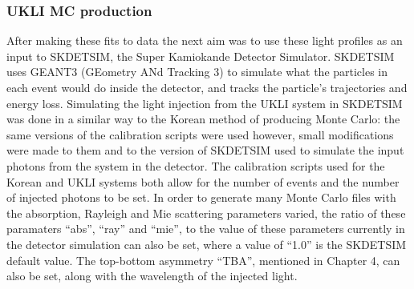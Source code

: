 \begin{figure}[!htbp]
    
\end{figure}


\subsubsection{UKLI MC production}
After making these fits to data the next aim was to use these light profiles as an input to SKDETSIM, the Super Kamiokande Detector Simulator. SKDETSIM uses GEANT3 (GEometry ANd Tracking 3) to simulate what the particles in each event would do inside the detector, and tracks the particle's trajectories and energy loss. Simulating the light injection from the UKLI system in SKDETSIM was done in a similar way to the Korean method of producing Monte Carlo: the same versions of the calibration scripts were used however, small modifications were made to them and to the version of SKDETSIM used to simulate the input photons from the system in the detector. The calibration scripts used for the Korean and UKLI systems both allow for the number of events and the number of injected photons to be set. In order to generate many Monte Carlo files with the absorption, Rayleigh and Mie scattering parameters varied, the ratio of these paramaters ``abs'', ``ray'' and ``mie'', to the value of these parameters currently in the detector simulation can also be set, where a value of ``1.0'' is the SKDETSIM default value. The top-bottom asymmetry ``TBA'', mentioned in Chapter 4, can also be set, along with the wavelength of the injected light.
\newline
